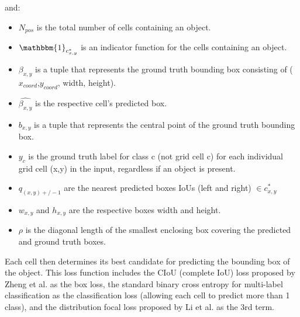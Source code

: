 \documentclass[10pt,twocolumn,letterpaper]{article}
\begin{document}
    
and:
\begin{itemize}
\item $N_{pos}$ is the total number of cells containing an object.
\item $\mathbbm{1}_{c^*_{x,y}}$ is an indicator function for the cells containing an object. 
\item $\beta_{x,y}$ is a tuple that represents the ground truth bounding box consisting of ($x_{coord}$,$y_{coord}$, width, height).
\item $\hat{\beta_{x,y}}$ is the respective cell's predicted box.
\item $b_{x,y}$ is a tuple that represents the central point of the ground truth bounding box.
\item $y_c$ is the ground truth label for class c (not grid cell c) for each individual grid cell (x,y) in the input, regardless if an object is present.
\item $q_{(x,y)+/- 1}$ are the nearest predicted boxes IoUs (left and right) $\in c^*_{x,y}$
\item $w_{x,y}$ and $h_{x,y}$ are the respective boxes width and height.
\item $\rho$ is the diagonal length of the smallest enclosing box covering the predicted and ground truth boxes.
\end{itemize}

Each cell then determines its best candidate for predicting the bounding box of the object. This loss function includes the CIoU (complete IoU) loss proposed by Zheng et al.\cite{CIoU} as the box loss, the standard binary cross entropy for multi-label classification as the classification loss (allowing each cell to predict more than 1 class), and the distribution focal loss proposed by Li et al.\cite{GFL} as the 3rd term.
    
\end{document}
